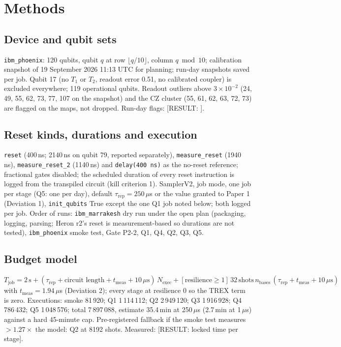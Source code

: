 \documentclass[aps,pra,reprint,superscriptaddress,nofootinbib,longbibliography,amsmath,amssymb]{revtex4-2}
\newcommand{\placeholder}[1]{\textcolor{red!70!black}{[RESULT: #1]}}
\begin{document}
\section{Methods}\label{sec:methods}
\subsection{Device and qubit sets}
\texttt{ibm\_phoenix}: 120 qubits, qubit $q$ at row $\lfloor q/10\rfloor$, column $q \bmod 10$; calibration snapshot of 19 September 2026 11:13 UTC for planning; run-day snapshots saved per job. Qubit 17 (no $T_1$ or $T_2$, readout error 0.51, no calibrated coupler) is excluded everywhere; 119 operational qubits. Readout outliers above $3\times10^{-2}$ (24, 49, 55, 62, 73, 77, 107 on the snapshot) and the CZ cluster (55, 61, 62, 63, 72, 73) are flagged on the maps, not dropped. Run-day flags: \placeholder{}.

\subsection{Reset kinds, durations and execution}
\texttt{reset} (400\,ns; 2140\,ns on qubit 79, reported separately), \texttt{measure\_reset} (1940\,ns), \texttt{measure\_reset\_2} (1140\,ns) and \texttt{delay(400\,ns)} as the no-reset reference; fractional gates disabled; the scheduled duration of every reset instruction is logged from the transpiled circuit (kill criterion 1). SamplerV2, job mode, one job per stage (Q5: one per day), default $\tau_{\mathrm{rep}} = 250\,\mu$s or the value granted to Paper 1 (Deviation 1), \texttt{init\_qubits} True except the one Q1 job noted below; both logged per job. Order of runs: \texttt{ibm\_marrakesh} dry run under the open plan (packaging, logging, parsing; Heron r2's reset is measurement-based so durations are not tested), \texttt{ibm\_phoenix} smoke test, Gate P2-2, Q1, Q4, Q2, Q3, Q5.

\subsection{Budget model}
$T_{\mathrm{job}} = 2\,\mathrm{s} + (\tau_{\mathrm{rep}} + \text{circuit length} + t_{\mathrm{meas}} + 10\,\mu\mathrm{s})\,N_{\mathrm{exec}} + [\text{resilience}\geq1]\,32\,\text{shots}\,n_{\mathrm{bases}}\,(\tau_{\mathrm{rep}} + t_{\mathrm{meas}} + 10\,\mu\mathrm{s})$ with $t_{\mathrm{meas}} = 1.94\,\mu$s (Deviation 2); every stage at resilience 0 so the TREX term is zero. Executions: smoke 81\,920; Q1 1\,114\,112; Q2 2\,949\,120; Q3 1\,916\,928; Q4 786\,432; Q5 1\,048\,576; total 7\,897\,088, estimate 35.4\,min at 250\,$\mu$s (2.7\,min at 1\,$\mu$s) against a hard 45-minute cap. Pre-registered fallback if the smoke test measures $> 1.27\times$ the model: Q2 at 8192 shots. Measured: \placeholder{locked time per stage}.
\end{document}
